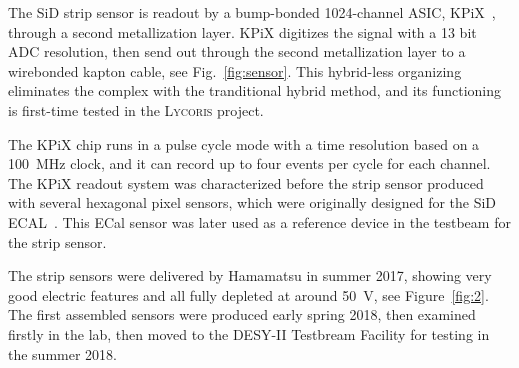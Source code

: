 \documentclass[conference]{IEEEtran}
\def\lycoris{\textsc{Lycoris }}%
\begin{document}
The SiD strip sensor is readout by a bump-bonded 1024-channel ASIC, KPiX~\cite{kpix}, through a second metallization layer.
KPiX digitizes the signal with a 13 bit ADC resolution, then send out through the second metallization layer to a wirebonded kapton cable, see Fig.~\ref{fig:sensor}.
This hybrid-less organizing eliminates the complex with the tranditional hybrid method, and its functioning is first-time tested in the \lycoris project.

The KPiX chip runs in a pulse cycle mode with a time resolution based on a \SI{100}{MHz} clock, and it can record up to four events per cycle for each channel.
The KPiX readout system was characterized before the strip sensor produced with several hexagonal pixel sensors, which were originally designed for the SiD ECAL~\cite{Behnke:2013lya}.
This ECal sensor was later used as a reference device in the testbeam for the strip sensor.

The strip sensors were delivered by Hamamatsu in summer 2017, showing very good electric features and all fully depleted at around \SI{50}{\volt}, see Figure~\ref{fig:2}.
The first assembled sensors were produced early spring 2018, then examined firstly in the lab, then moved to the DESY-II Testbream Facility for testing in the summer 2018.
\end{document}
